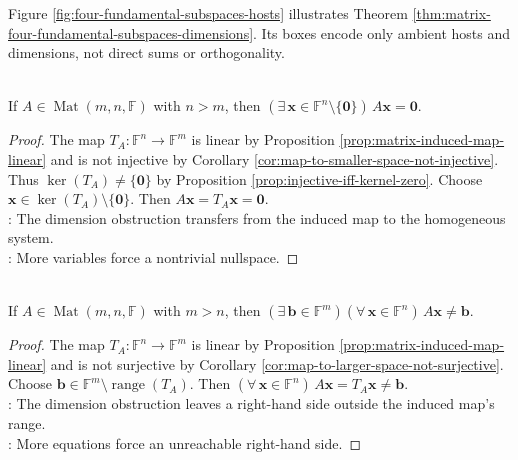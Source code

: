 Figure \ref{fig:four-fundamental-subspaces-hosts} illustrates Theorem \ref{thm:matrix-four-fundamental-subspaces-dimensions}. Its boxes encode only ambient hosts and dimensions, not direct sums or orthogonality.

\begin{corollary} \label{cor:homogeneous-system-more-variables-than-equations} \\
If $A\in\operatorname{Mat}(m,n,\mathbb{F})$ with $n>m$, then $(\exists\,\mathbf{x}\in\mathbb{F}^n\setminus\{\mathbf{0}\})\,A\mathbf{x}=\mathbf{0}$.
\begin{proof}
The map $T_A:\mathbb{F}^n\to\mathbb{F}^m$ is linear by Proposition \ref{prop:matrix-induced-map-linear} and is not injective by Corollary \ref{cor:map-to-smaller-space-not-injective}.\\
Thus $\ker(T_A)\neq\{\mathbf{0}\}$ by Proposition \ref{prop:injective-iff-kernel-zero}. Choose $\mathbf{x}\in\ker(T_A)\setminus\{\mathbf{0}\}$. Then $A\mathbf{x}=T_A\mathbf{x}=\mathbf{0}$.\\
: The dimension obstruction transfers from the induced map to the homogeneous system.\\
: More variables force a nontrivial nullspace.
\end{proof}
\end{corollary}

\begin{corollary} \label{cor:inhomogeneous-system-more-equations-than-variables} \\
If $A\in\operatorname{Mat}(m,n,\mathbb{F})$ with $m>n$, then $(\exists\,\mathbf{b}\in\mathbb{F}^m)(\forall\,\mathbf{x}\in\mathbb{F}^n)\,A\mathbf{x}\neq\mathbf{b}$.
\begin{proof}
The map $T_A:\mathbb{F}^n\to\mathbb{F}^m$ is linear by Proposition \ref{prop:matrix-induced-map-linear} and is not surjective by Corollary \ref{cor:map-to-larger-space-not-surjective}.\\
Choose $\mathbf{b}\in\mathbb{F}^m\setminus\operatorname{range}(T_A)$. Then $(\forall\,\mathbf{x}\in\mathbb{F}^n)\,A\mathbf{x}=T_A\mathbf{x}\neq\mathbf{b}$.\\
: The dimension obstruction leaves a right-hand side outside the induced map's range.\\
: More equations force an unreachable right-hand side.
\end{proof}
\end{corollary}
